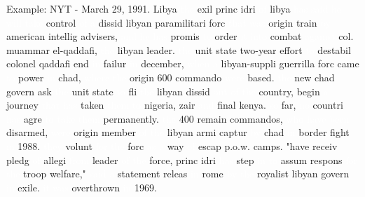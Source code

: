 \documentclass[english]{beamer}
\begin{document}
\begin{frame}
{\normalsize{Example: NYT - March 29, 1991. Libya}}
\textcolor{white}{the} exil princ idri \textcolor{white}{of} libya %
\textcolor{white}{has} \textcolor{white}{said} \textcolor{white}{he} %
\textcolor{white}{will} \textcolor{white}{take} control \textcolor{white}{of}
\textcolor{white}{a} dissid libyan paramilitari forc \textcolor{white}{that} %
\textcolor{white}{was} origin train \textcolor{white}{by} american intellig
advisers, \textcolor{white}{and} \textcolor{white}{he} \textcolor{white}{has}
promis \textcolor{white}{to} order \textcolor{white}{it} %
\textcolor{white}{into} combat \textcolor{white}{against} col. muammar
el-qaddafi, \textcolor{white}{the} libyan leader. \textcolor{white}{the}
unit state two-year effort \textcolor{white}{to} destabil colonel qaddafi
end \textcolor{white}{in} failur \textcolor{white}{in} december, %
\textcolor{white}{when} \textcolor{white}{a} libyan-suppli guerrilla forc
came \textcolor{white}{to} power \textcolor{white}{in} chad, %
\textcolor{white}{where} \textcolor{white}{the} origin 600 commando %
\textcolor{white}{were} based. \textcolor{white}{the} new chad govern ask %
\textcolor{white}{the} unit state \textcolor{white}{to} fli %
\textcolor{white}{the} libyan dissid \textcolor{white}{out} %
\textcolor{white}{of} \textcolor{white}{the} country, begin %
\textcolor{white}{a} journey \textcolor{white}{that} \textcolor{white}{has}
taken \textcolor{white}{them} \textcolor{white}{to} nigeria, zair %
\textcolor{white}{and} final kenya. \textcolor{white}{so} far, %
\textcolor{white}{no} countri \textcolor{white}{has} agre %
\textcolor{white}{to} \textcolor{white}{take} \textcolor{white}{them}
permanently. \textcolor{white}{the} 400 remain commandos, %
\textcolor{white}{who} \textcolor{white}{have} \textcolor{white}{been}
disarmed, \textcolor{white}{were} origin member \textcolor{white}{of} %
\textcolor{white}{the} libyan armi captur \textcolor{white}{by} chad %
\textcolor{white}{in} border fight \textcolor{white}{in} 1988. %
\textcolor{white}{they} volunt \textcolor{white}{for} \textcolor{white}{the}
forc \textcolor{white}{as} \textcolor{white}{a} way \textcolor{white}{of}
escap p.o.w. camps. "have receiv pledg \textcolor{white}{of} allegi %
\textcolor{white}{from} leader \textcolor{white}{of} \textcolor{white}{the}
force, princ idri \textcolor{white}{has} step \textcolor{white}{in} %
\textcolor{white}{to} assum respons \textcolor{white}{for} %
\textcolor{white}{the} troop welfare," \textcolor{white}{said} %
\textcolor{white}{a} statement releas \textcolor{white}{in} rome %
\textcolor{white}{by} \textcolor{white}{the} royalist libyan govern %
\textcolor{white}{in} exile. \textcolor{white}{it} \textcolor{white}{was}
overthrown \textcolor{white}{in} 1969.
\end{frame}
\end{document}
